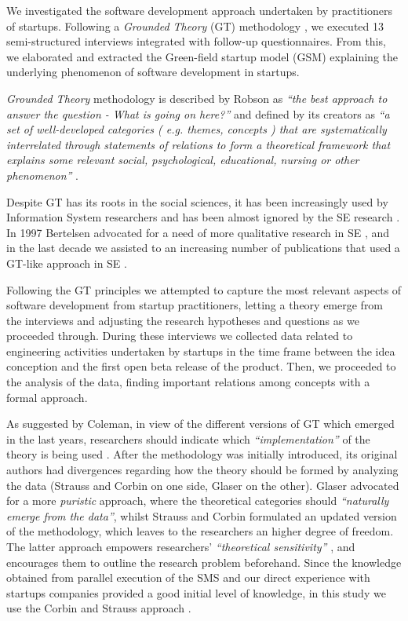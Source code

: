 \documentclass[10pt,journal,letterpaper,compsoc]{IEEEtran}
\begin{document}
We investigated the software development approach undertaken by practitioners of startups.  Following a \textit{Grounded Theory} (GT) methodology \cite{Glaser1978}, we executed 13 semi-structured interviews integrated with follow-up questionnaires. From this, we elaborated and extracted the Green-field startup model (GSM) explaining the underlying phenomenon of software development in startups.

\textit{Grounded Theory} methodology is described by Robson as \textit{``the best approach to answer the question - What is going on here?''} and defined by its creators \cite{ColinRobson2009} as \textit{``a set of well-developed categories ( e.g. themes, concepts ) that are systematically interrelated through statements of relations to form a theoretical framework that explains some relevant social, psychological, educational, nursing or other phenomenon''} .

Despite GT has its roots in the social sciences, it has been increasingly used by Information System researchers and has been almost ignored by the SE research \cite{Coleman2007}. In 1997 Bertelsen advocated for a need of more qualitative research in SE \cite{Bertelsen1997}, and in the last decade we assisted to an increasing number of publications that used a GT-like approach in SE \cite{Coleman2008a,Coleman2007, Sulayman2012}.

Following the GT principles we attempted to capture the most relevant aspects of software development from startup practitioners, letting a theory emerge from the interviews and adjusting the research hypotheses and questions as we proceeded through. During these interviews we collected data related to engineering activities undertaken by startups in the time frame between the idea conception and the first open beta release of the product.  Then, we proceeded to the analysis of the data, finding important relations among concepts with a formal approach.

As suggested by Coleman, in view of the different versions of GT which emerged in the last years, researchers should indicate which \textit{``implementation''} of the theory is being used \cite{Coleman2007}. After the methodology was initially introduced, its original authors  had divergences regarding how the theory should be formed by analyzing the data (Strauss and Corbin on one side, Glaser on the other).  Glaser advocated for a more \textit{puristic} approach, where the theoretical categories should \textit{``naturally emerge from the data''}, whilst Strauss and Corbin formulated an updated version of the methodology, which leaves to the researchers an higher degree of freedom. The latter approach empowers researchers' \textit{``theoretical sensitivity''} \cite{Corbin1990}, and encourages them to outline the research problem beforehand. Since the knowledge obtained from parallel execution of the SMS \cite{SMS} and our direct experience with startups companies provided 
a good initial level of knowledge, in this study we use the Corbin and Strauss approach \cite{Strauss1998}.
\end{document}
